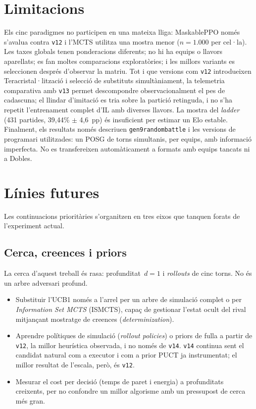 \section{Limitacions}

Els cinc paradigmes no participen en una mateixa lliga: MaskablePPO només s'avalua contra \texttt{v12} i l'MCTS utilitza una mostra menor ($n=1.000$ per cel·la). Les taxes globals tenen ponderacions diferents; no hi ha equips o llavors aparellats; es fan moltes comparacions exploratòries; i les millors variants es seleccionen després d'observar la matriu. Tot i que versions com \texttt{v12} introdueixen Teracristal·lització i selecció de substituts simultàniament, la telemetria comparativa amb \texttt{v13} permet descompondre observacionalment el pes de cadascuna; el llindar d'imitació es tria sobre la partició retinguda, i no s'ha repetit l'entrenament complet d'IL amb diverses llavors. La mostra del \emph{ladder} (431 partides, 39,44\% $\pm$ 4,6~pp) és insuficient per estimar un Elo estable. Finalment, els resultats només descriuen \texttt{gen9randombattle} i les versions de programari utilitzades: un POSG de torns simultanis, per equips, amb informació imperfecta. No es transfereixen automàticament a formats amb equips tancats ni a Dobles.

\section{Línies futures}

Les continuacions prioritàries s'organitzen en tres eixos que tanquen forats de l'experiment actual.

\subsection{Cerca, creences i priors}

La cerca d'aquest treball és rasa: profunditat~$d=1$ i \emph{rollouts} de cinc torns. No és un arbre adversari profund.

\begin{itemize}
    \item Substituir l'UCB1 només a l'arrel per un arbre de simulació complet o per \textit{Information Set MCTS} (ISMCTS), capaç de gestionar l'estat ocult del rival mitjançant mostratge de creences (\emph{determinization}).
    \item Aprendre polítiques de simulació (\emph{rollout policies}) o priors de fulla a partir de \texttt{v12}, la millor heurística observada, i no només de \texttt{v14}. \texttt{v14} continua sent el candidat natural com a executor i com a prior PUCT ja instrumentat; el millor resultat de l'escala, però, és \texttt{v12}.
    \item Mesurar el cost per decisió (temps de paret i energia) a profunditats creixents, per no confondre un millor algorisme amb un pressupost de cerca més gran.
\end{itemize}

